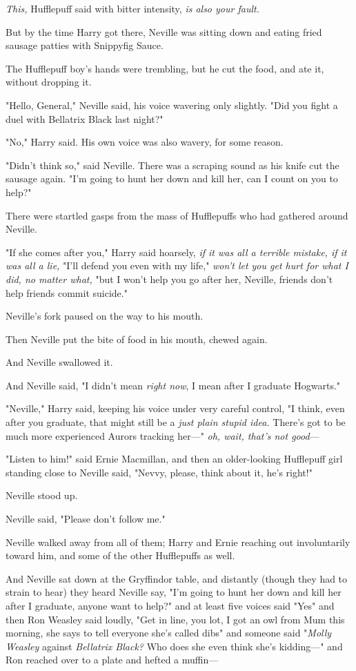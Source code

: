\emph{This,} Hufflepuff said with bitter intensity, \emph{is also your fault.}

But by the time Harry got there, Neville was sitting down and eating fried
sausage patties with Snippyfig Sauce.

The Hufflepuff boy's hands were trembling, but he cut the food, and ate it,
without dropping it.

"Hello, General," Neville said, his voice wavering only slightly. "Did you
fight a duel with Bellatrix Black last night?"

"No," Harry said. His own voice was also wavery, for some reason.

"Didn't think so," said Neville. There was a scraping sound as his knife cut
the sausage again. "I'm going to hunt her down and kill her, can I count on you
to help?"

There were startled gasps from the mass of Hufflepuffs who had gathered around
Neville.

"If she comes after you," Harry said hoarsely, \emph{if it was all a terrible
mistake, if it was all a lie,} "I'll defend you even with my life," \emph{won't
let you get hurt for what I did, no matter what,} "but I won't help you go
after her, Neville, friends don't help friends commit suicide."

Neville's fork paused on the way to his mouth.

Then Neville put the bite of food in his mouth, chewed again.

And Neville swallowed it.

And Neville said, "I didn't mean \emph{right now}, I mean after I graduate
Hogwarts."

"Neville," Harry said, keeping his voice under very careful control, "I think,
even after you graduate, that might still be a \emph{just plain stupid idea.}
There's got to be much more experienced Aurors tracking her—" \emph{oh, wait,
that's not good}—

"Listen to him!" said Ernie Macmillan, and then an older-looking Hufflepuff
girl standing close to Neville said, "Nevvy, please, think about it, he's
right!"

Neville stood up.

Neville said, "Please don't follow me."

Neville walked away from all of them; Harry and Ernie reaching out
involuntarily toward him, and some of the other Hufflepuffs as well.

And Neville sat down at the Gryffindor table, and distantly (though they had to
strain to hear) they heard Neville say, "I'm going to hunt her down and kill
her after I graduate, anyone want to help?" and at least five voices said "Yes"
and then Ron Weasley said loudly, "Get in line, you lot, I got an owl from Mum
this morning, she says to tell everyone she's called dibs" and someone said
"\emph{Molly Weasley} against \emph{Bellatrix Black?} Who does she even think
she's kidding—" and Ron reached over to a plate and hefted a muffin—

